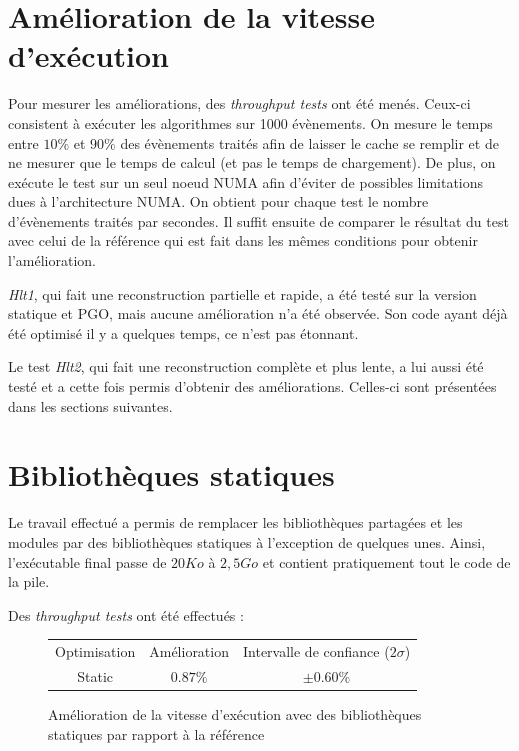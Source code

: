 \documentclass[a4paper,11pt]{report}
\begin{document}
\section{Amélioration de la vitesse d'exécution}
Pour mesurer les améliorations, des \emph{throughput tests} ont été menés.
Ceux-ci consistent à exécuter les algorithmes sur 1000 évènements.
On mesure le temps entre $10\%$ et $90\%$ des évènements traités afin de laisser le cache se remplir et de ne mesurer que le temps de calcul (et pas le temps de chargement).
De plus, on exécute le test sur un seul noeud NUMA afin d'éviter de possibles limitations dues à l'architecture NUMA.
On obtient pour chaque test le nombre d'évènements traités par secondes.
Il suffit ensuite de comparer le résultat du test avec celui de la référence qui est fait dans les mêmes conditions pour obtenir l'amélioration.

\emph{Hlt1}, qui fait une reconstruction partielle et rapide, a été testé sur la version statique et PGO, mais aucune amélioration n'a été observée.
Son code ayant déjà été optimisé il y a quelques temps, ce n'est pas étonnant.

Le test \emph{Hlt2}, qui fait une reconstruction complète et plus lente, a lui aussi été testé et a cette fois permis d'obtenir des améliorations.
Celles-ci sont présentées dans les sections suivantes.

\section{Bibliothèques statiques}
Le travail effectué a permis de remplacer les bibliothèques partagées et les modules par des bibliothèques statiques à l'exception de quelques unes.
Ainsi, l'exécutable final passe de $20 Ko$ à $2,5 Go$ et contient pratiquement tout le code de la pile.

Des \emph{throughput tests} ont été effectués :
\begin{figure}[H]
    \begin{center}
        \begin{tabular}{ c c c }
            Optimisation & Amélioration & Intervalle de confiance ($2\sigma$) \\
            Static       & $0.87\%$     & $\pm 0.60\%$
        \end{tabular}
    \end{center}
    \caption{Amélioration de la vitesse d'exécution avec des bibliothèques statiques par rapport à la référence}
    \label{results_static}
\end{figure}
\end{document}
